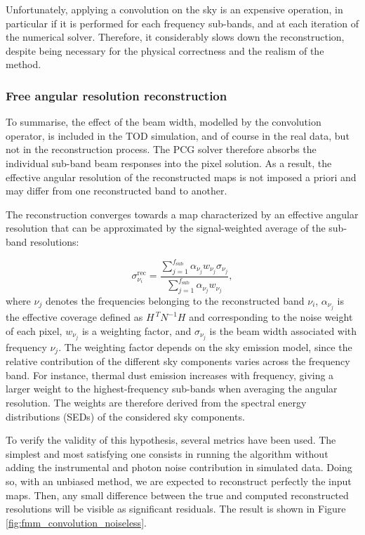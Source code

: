 \documentclass[../../thesis.tex]{subfiles}
\begin{document}
Unfortunately, applying a convolution on the sky is an expensive operation, in particular if it is performed for each frequency sub-bands, and at each iteration of the numerical solver. Therefore, it considerably slows down the reconstruction, despite being necessary for the physical correctness and the realism of the method.

\subsubsection{Free angular resolution reconstruction}

To summarise, the effect of the beam width, modelled by the convolution operator, is included in the TOD simulation, and of course in the real data, but not in the reconstruction process. The PCG solver therefore absorbs the individual sub-band beam responses into the pixel solution. As a result, the effective angular resolution of the reconstructed maps is not imposed a priori and may differ from one reconstructed band to another.

The reconstruction converges towards a map characterized by an effective angular resolution that can be approximated by the signal-weighted average of the sub-band resolutions:

\begin{equation}
    \sigma_{\nu_i}^{\mathrm{rec}} = \frac{\sum_{j=1}^{f_{\mathrm{sub}}}\alpha_{\nu_j} w_{\nu_j}\sigma_{\nu_j}} {\sum_{j=1}^{f_{\mathrm{sub}}} \alpha_{\nu_j} w_{\nu_j}},
\end{equation}
where $\nu_j$ denotes the frequencies belonging to the reconstructed band $\nu_i$, $\alpha_{\nu_j}$ is the effective coverage defined as $H^{~T}N^{-1}H$ and corresponding to the noise weight of each pixel, $w_{\nu_j}$ is a weighting factor, and $\sigma_{\nu_j}$ is the beam width associated with frequency $\nu_j$. The weighting factor depends on the sky emission model, since the relative contribution of the different sky components varies across the frequency band. For instance, thermal dust emission increases with frequency, giving a larger weight to the highest-frequency sub-bands when averaging the angular resolution. The weights are therefore derived from the spectral energy distributions (SEDs) of the considered sky components.

To verify the validity of this hypothesis, several metrics have been used. The simplest and most satisfying one consists in running the algorithm without adding the instrumental and photon noise contribution in simulated data. Doing so, with an unbiased method, we are expected to reconstruct perfectly the input maps. Then, any small difference between the true and computed reconstructed resolutions will be visible as significant residuals. The result is shown in Figure \ref{fig:fmm_convolution_noiseless}.
\end{document}
